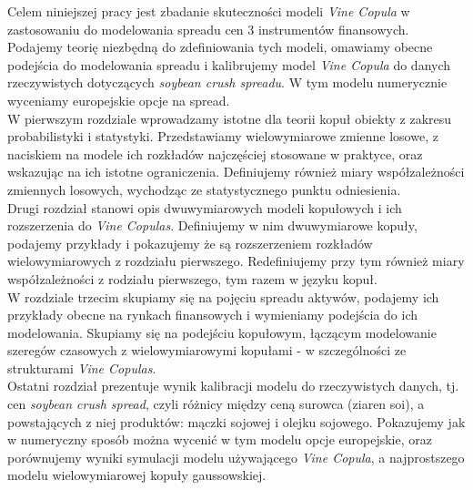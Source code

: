 \begin{wstep}[Wprowadzenie]
	Celem niniejszej pracy jest zbadanie skuteczności modeli \emph{Vine Copula} w zastosowaniu do modelowania spreadu cen 3 instrumentów finansowych. Podajemy teorię niezbędną do zdefiniowania tych modeli, omawiamy obecne podejścia do modelowania spreadu i kalibrujemy model \emph{Vine Copula} do danych rzeczywistych dotyczących \emph{soybean crush spreadu}. W tym modelu numerycznie wyceniamy europejskie opcje na spread.\\
	
	W pierwszym rozdziale wprowadzamy istotne dla teorii kopuł obiekty z zakresu probabilistyki i statystyki. Przedstawiamy wielowymiarowe zmienne losowe, z naciskiem na modele ich rozkładów najczęściej stosowane w praktyce, oraz wskazując na ich istotne ograniczenia. Definiujemy również miary współzależności zmiennych losowych, wychodząc ze statystycznego punktu odniesienia.\\
	
	Drugi rozdział stanowi opis dwuwymiarowych modeli kopułowych i ich rozszerzenia do \emph{Vine Copulas}. Definiujemy w nim dwuwymiarowe kopuły, podajemy przykłady i pokazujemy że są rozszerzeniem rozkładów wielowymiarowych z rozdziału pierwszego. Redefiniujemy przy tym również miary współzależności z rodziału pierwszego, tym razem w języku kopuł.\\
	
	W rozdziale trzecim skupiamy się na pojęciu spreadu aktywów, podajemy ich przykłady obecne na rynkach finansowych i wymieniamy podejścia do ich modelowania. Skupiamy się na podejściu kopułowym, łączącym modelowanie szeregów czasowych z wielowymiarowymi kopułami - w szczególności ze strukturami \emph{Vine Copulas}.\\
	
	Ostatni rozdział prezentuje wynik kalibracji modelu do rzeczywistych danych, tj. cen \emph{soybean crush spread}, czyli różnicy między ceną surowca (ziaren soi), a powstających z niej produktów: mączki sojowej i olejku sojowego. Pokazujemy jak w numeryczny sposób można wycenić w tym modelu opcje europejskie, oraz porównujemy wyniki symulacji modelu używającego \emph{Vine Copula}, a najprostszego modelu wielowymiarowej kopuły gaussowskiej.
	
\end{wstep}

